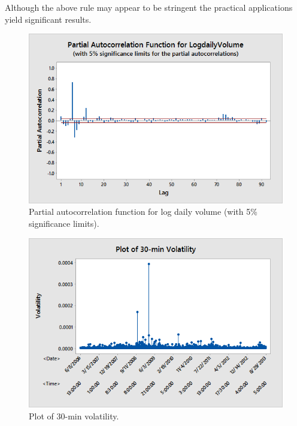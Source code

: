 
\noindent Although the above rule may appear to be stringent the practical applications yield significant results. 
	
        \begin{figure}[!ht]
        \centering
        \includegraphics[width=\textwidth]{chapters/chapter_stat_ts/figures/logdaily.png}
        \caption{Partial autocorrelation function for log daily volume (with 5\% significance limits). \label{fig:logdailyvolume}}
        \end{figure}
        
        \begin{figure}[!ht]
        \centering
        \includegraphics[width=\textwidth]{chapters/chapter_stat_ts/figures/30min.png}
        \caption{Plot of 30-min volatility. \label{fig:30min}}
        \end{figure}
        
